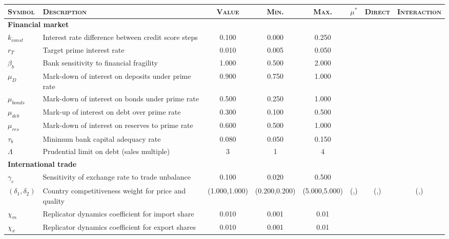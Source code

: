 \documentclass[a4paper,11pt]{article}
\begin{document}
\begin{appendices}
\begin{landscape}
\begin{table}[h]
\centering
\footnotesize
\begin{tabular}{llcccccc}
\toprule
\textsc{Symbol} 				& \textsc{Description} 									& \textsc{Value}	& \textsc{Min.}	& \textsc{Max.}	& \textsc{$\mu^*$}	& \textsc{Direct}	& \textsc{Interaction} \\
\midrule
\multicolumn{2}{l}{\textbf{Financial market}} \\
$k_{const}$						& Interest rate difference between credit score steps	& 0.100				& 0.000			& 0.250			& 					& 					& 	 \\
$r_T$ 							& Target prime interest rate 							& 0.010				& 0.005			& 0.050			& 					& 					& 	 \\
$\beta_b$						& Bank sensitivity to financial fragility			 	& 1.000				& 0.500			& 2.000			& 					& 					& 	 \\
$\mu_D$							& Mark-down of interest on deposits under prime rate 	& 0.900				& 0.750			& 1.000			& 					& 					& 	 \\
$\mu_{bonds}$					& Mark-down of interest on bonds under prime rate		& 0.500				& 0.250			& 1.000			& 					& 					& 	 \\
$\mu_{deb}$						& Mark-up of interest on debt over prime rate			& 0.300				& 0.100			& 0.500			& 					& 					& 	 \\
$\mu_{res}$						& Mark-down of interest on reserves to prime rate		& 0.600				& 0.500			& 1.000			& 					& 					& 	 \\
$\tau_b$						& Minimum bank capital adequacy rate					& 0.080				& 0.050			& 0.150			& 					& 					& 	 \\
$\Lambda$						& Prudential limit on debt (sales multiple)				& 3					& 1				& 4				& 					& 					& 	 \\
\midrule
\multicolumn{2}{l}{\textbf{International trade}} \\
$\gamma_e$						& Sensitivity of exchange rate to trade unbalance		& 0.100				& 0.020			& 0.500			& 					& 					& 	 \\
$(\delta_1,\delta_2)$			& Country competitiveness weight for price and quality	& (1.000,1.000)		& (0.200,0.200)	& (5.000,5.000)	& (,)				& (,)				& (,) \\
$\chi_m$ 						& Replicator dynamics coefficient for import share		& 0.010				& 0.001			& 0.01			& 					& 					& 	 \\
$\chi_x$						& Replicator dynamics coefficient for export shares		& 0.010				& 0.001			& 0.01			& 					& 					& 	 \\

\end{tabular}
\end{table}
\end{landscape}
\end{appendices}
\end{document}
